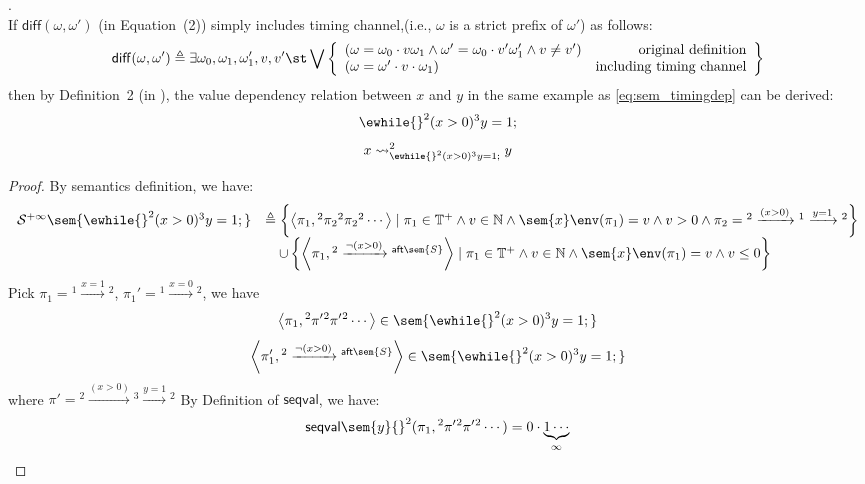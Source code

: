  \begin{example}.
 \label{ex:overapp}
 \\
 If $\mathsf{diff}(\omega, \omega')$ (in \cite{cousot2019abstract} Equation~(2)) simply includes timing channel,(i.e., $\omega$ is a strict prefix of $\omega'$) as follows:
 \[
 	\mathsf{diff}(\omega, \omega') \triangleq \exists \omega_0, \omega_1, \omega_1', v, v' 
 	\st \bigvee \left\{
 	\begin{array}{lr}
 	(\omega = \omega_0 \cdot v \omega_1
 		\land \omega' = \omega_0 \cdot v' \omega_1' \land v \neq v') & \mbox{original definition} \\
 	(\omega = \omega' \cdot v \cdot \omega_1) & \mbox{including timing channel} \\
 	\end{array}
 	\right\}
 \] 
 then by Definition~2 (in \cite{cousot2019abstract}), the value dependency relation between $x$ and $y$ in the same example as \ref{eq:sem_timingdep} can be derived:
 \[
 	\ewhile {}^2 (x > 0) {}^3 y = 1; 
 \]
  \[
 	x \rightsquigarrow^{2}_{\ewhile {}^2 (x > 0) {}^3 y = 1;} y
 \]
 \begin{proof}
 By semantics definition, we have:
 \begin{equation}
 \label{eq:sem_timingoverapp}
 \begin{array}{ll}
   \mathcal{S}^{+\infty}\sem{ \ewhile {}^2 (x > 0) {}^3 y = 1; } 
 & \triangleq  
 \left\{ \left< \pi_1{}, {}^2 \pi_2 {}^2 \pi_2 {}^2\cdots \right>
 \mid \pi_1 \in \mathbb{T^{+}} \land v \in \mathbb{N} \land
 \sem{x}\env(\pi_1) = v
 \land v > 0  \land
 \pi_2 = {}^2 \xrightarrow{(x > 0)} {}^1 \xrightarrow{y = 1} {}^2
 \right\}
 \\ & \quad \cup 
 \left\{ \left< \pi_1, {}^2 \xrightarrow{\neg(x > 0)} {}^{\mathsf{aft}\sem{S}} \right> 
 \mid \pi_1 \in \mathbb{T^{+}} \land v \in \mathbb{N} \land
  \sem{x}\env(\pi_1) = v
 \land v \leq 0 \right\}
 \end{array}
 \end{equation}
 Pick $\pi_1 =  {}^1 \xrightarrow{x = 1} {}^2$, 
 $\pi_1' =  {}^1 \xrightarrow{x = 0} {}^2$, we have
 \[
 	\left< \pi_1, {}^2 \pi' {}^2 \pi' {}^2 \cdots \right> \in \sem{\ewhile {}^2 (x > 0) {}^3 y = 1;}
 \]
 \[
 	\left< \pi_1', {}^2 \xrightarrow{\neg(x > 0)} {}^{\mathsf{aft}\sem{S}}\right> \in \sem{\ewhile {}^2 (x > 0) {}^3 y = 1; }
 \]
 where $\pi' = {}^2 \xrightarrow{(x > 0)} {}^3 \xrightarrow{y = 1} {}^2$
By Definition of $\mathsf{seqval}$, we have:
 \[
  \mathsf{seqval}\sem{y}{}^2(\pi_1, {}^2 \pi' {}^2 \pi' {}^2 \cdots ) = 0 \cdot \underbrace{1 \cdots}_{\infty}
\]
\end{proof}
\end{example}
